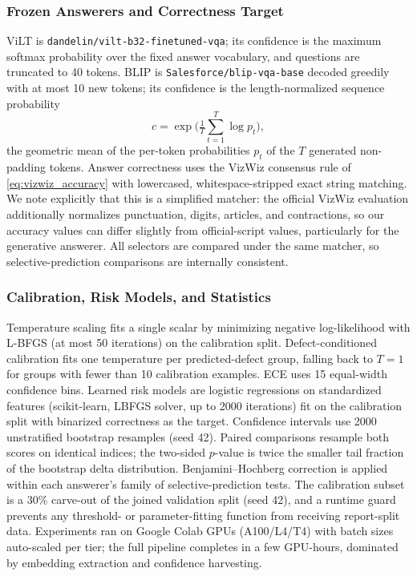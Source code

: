 \documentclass{ieeeaccess}
\newcommand{\vilt}{ViLT}
\newcommand{\blip}{BLIP}
\begin{document}
\subsubsection{Frozen Answerers and Correctness Target}
\vilt{} is \texttt{dandelin/vilt-b32-finetuned-vqa}; its
confidence is the maximum softmax probability over the fixed
answer vocabulary, and questions are truncated to 40 tokens.
\blip{} is \texttt{Salesforce/blip-vqa-base} decoded greedily
with at most 10 new tokens; its confidence is the
length-normalized sequence probability
\begin{equation}
c = \exp\!\Big(\tfrac{1}{T}\textstyle\sum_{t=1}^{T} \log p_t\Big),
\end{equation}
the geometric mean of the per-token probabilities $p_t$ of the
$T$ generated non-padding tokens. Answer correctness uses the
VizWiz consensus rule of \eqref{eq:vizwiz_accuracy} with
lowercased, whitespace-stripped exact string matching. We note
explicitly that this is a simplified matcher: the official VizWiz
evaluation additionally normalizes punctuation, digits, articles,
and contractions, so our accuracy values can differ slightly from
official-script values, particularly for the generative answerer.
All selectors are compared under the same matcher, so
selective-prediction comparisons are internally consistent.

\subsubsection{Calibration, Risk Models, and Statistics}
Temperature scaling fits a single scalar by minimizing
negative log-likelihood with L-BFGS (at most 50 iterations) on
the calibration split. Defect-conditioned calibration fits one
temperature per predicted-defect group, falling back to $T=1$
for groups with fewer than 10 calibration examples. ECE uses 15
equal-width confidence bins. Learned risk models are logistic
regressions on standardized features (scikit-learn, LBFGS
solver, up to 2000 iterations) fit on the calibration split with
binarized correctness as the target. Confidence intervals use
2000 unstratified bootstrap resamples (seed 42). Paired
comparisons resample both scores on identical indices; the
two-sided $p$-value is twice the smaller tail fraction of the
bootstrap delta distribution. Benjamini--Hochberg correction is
applied within each answerer's family of selective-prediction
tests. The calibration subset is a 30\% carve-out of the joined
validation split (seed 42), and a runtime guard prevents any
threshold- or parameter-fitting function from receiving
report-split data. Experiments ran on Google Colab GPUs
(A100/L4/T4) with batch sizes auto-scaled per tier; the full
pipeline completes in a few GPU-hours, dominated by embedding
extraction and confidence harvesting.
\end{document}
